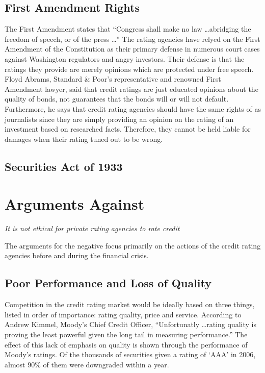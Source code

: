 \documentclass[11pt]{article}
\begin{document}
\begin{multicols}{2}
\subsection{First Amendment Rights}
The First Amendment states that ``Congress shall make no law \ldots abridging the freedom of speech, or of the press \ldots'' The rating agencies have relyed on the First Amendment of the Constitution as their primary defense in numerous court cases against Washington regulators and angry investors. Their defense is that the ratings they provide are merely opinions which are protected under free speech. \cite{CivilLiability, CRS} Floyd Abrams, Standard \& Poor's representative and renowned First Amendment lawyer, said that credit ratings are just educated opinions about the quality of bonds, not guarantees that the bonds will or will not default.  Furthermore, he says that credit rating agencies should have the same rights of as journalists since they are simply providing an opinion on the rating of an investment based on researched facts.  Therefore, they cannot be held liable for damages when their rating tuned out to be wrong.  \cite{nyTimesFirstAmendment}

\subsection{Securities Act of 1933}


\section{Arguments Against}
\textit{It is not ethical for private rating agencies to rate credit}

The arguments for the negative focus primarily on the actions of the credit rating agencies before and during the financial crisis. 
\subsection{Poor Performance and Loss of Quality}
Competition in the credit rating market would be ideally based on three things, listed in order of importance: rating quality, price and service. \cite[p. 210]{govtReport} According to Andrew Kimmel, Moody's Chief Credit Officer, ``Unfortunatly \ldots rating quality is proving the least powerful given the long tail in measuring performance.''  The effect of this lack of emphasis on quality is shown through the performance of Moody's ratings.  Of the thousands of securities given a rating of `AAA' in 2006, almost 90\% of them were downgraded within a year. \cite{ratingEthics, govtReport}


\end{multicols}
\end{document}
